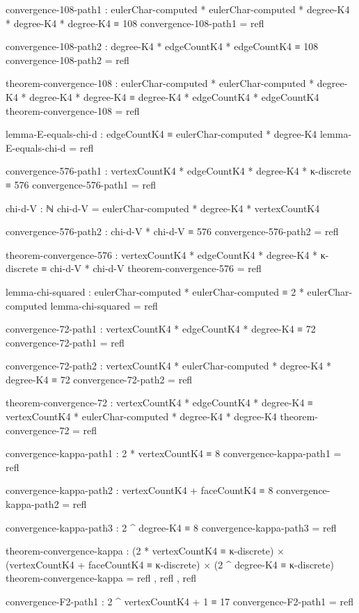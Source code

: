 \documentclass[11pt,a4paper]{book}
\begin{document}
\begin{code}
convergence-108-path1 : eulerChar-computed * eulerChar-computed * degree-K4 * degree-K4 * degree-K4 ≡ 108
convergence-108-path1 = refl

convergence-108-path2 : degree-K4 * edgeCountK4 * edgeCountK4 ≡ 108
convergence-108-path2 = refl

theorem-convergence-108 : eulerChar-computed * eulerChar-computed * degree-K4 * degree-K4 * degree-K4 
                        ≡ degree-K4 * edgeCountK4 * edgeCountK4
theorem-convergence-108 = refl

lemma-E-equals-chi-d : edgeCountK4 ≡ eulerChar-computed * degree-K4
lemma-E-equals-chi-d = refl

convergence-576-path1 : vertexCountK4 * edgeCountK4 * degree-K4 * κ-discrete ≡ 576
convergence-576-path1 = refl

chi-d-V : ℕ
chi-d-V = eulerChar-computed * degree-K4 * vertexCountK4

convergence-576-path2 : chi-d-V * chi-d-V ≡ 576
convergence-576-path2 = refl

theorem-convergence-576 : vertexCountK4 * edgeCountK4 * degree-K4 * κ-discrete 
                        ≡ chi-d-V * chi-d-V
theorem-convergence-576 = refl

lemma-chi-squared : eulerChar-computed * eulerChar-computed ≡ 2 * eulerChar-computed
lemma-chi-squared = refl

convergence-72-path1 : vertexCountK4 * edgeCountK4 * degree-K4 ≡ 72
convergence-72-path1 = refl

convergence-72-path2 : vertexCountK4 * eulerChar-computed * degree-K4 * degree-K4 ≡ 72
convergence-72-path2 = refl

theorem-convergence-72 : vertexCountK4 * edgeCountK4 * degree-K4 
                       ≡ vertexCountK4 * eulerChar-computed * degree-K4 * degree-K4
theorem-convergence-72 = refl

convergence-kappa-path1 : 2 * vertexCountK4 ≡ 8
convergence-kappa-path1 = refl

convergence-kappa-path2 : vertexCountK4 + faceCountK4 ≡ 8
convergence-kappa-path2 = refl

convergence-kappa-path3 : 2 ^ degree-K4 ≡ 8
convergence-kappa-path3 = refl

theorem-convergence-kappa : (2 * vertexCountK4 ≡ κ-discrete) × 
                            (vertexCountK4 + faceCountK4 ≡ κ-discrete) ×
                            (2 ^ degree-K4 ≡ κ-discrete)
theorem-convergence-kappa = refl , refl , refl


convergence-F2-path1 : 2 ^ vertexCountK4 + 1 ≡ 17
convergence-F2-path1 = refl


\end{code}
\end{document}

